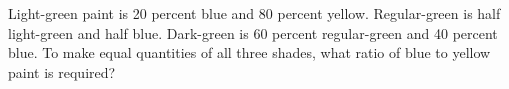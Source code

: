Light-green paint is 20 percent blue and 80 percent yellow. Regular-green is half light-green and half blue. Dark-green is 60 percent regular-green and 40 percent blue. To make equal quantities of all three shades, what ratio of blue to yellow paint is required?
